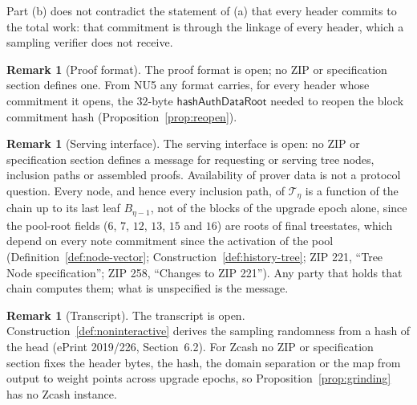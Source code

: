 \documentclass[11pt,a4paper]{article}
\theoremstyle{definition}
\newtheorem{remark}[theorem]{Remark}
\begin{document}
Part (b) does not contradict the statement of (a) that every header commits
to the total work: that commitment is through the linkage of every header,
which a sampling verifier does not receive.

\begin{remark}[Proof format]
The proof format is open; no ZIP or specification section defines one. From
NU5 any format carries, for every header whose commitment it opens, the
$32$-byte $\mathsf{hashAuthDataRoot}$ needed to reopen the block commitment
hash (Proposition~\ref{prop:reopen}).
\end{remark}

\begin{remark}[Serving interface]
The serving interface is open: no ZIP or specification section defines a
message for requesting or serving tree nodes, inclusion paths or assembled
proofs. Availability of prover data is not a protocol question. Every node,
and hence every inclusion path, of $\mathcal{T}_\eta$ is a function of the
chain up to its last leaf $B_{\eta-1}$, not of the blocks of the upgrade
epoch alone, since the pool-root fields ($6$, $7$, $12$, $13$, $15$ and
$16$) are roots of final treestates, which depend on every note commitment
since the activation of the pool (Definition~\ref{def:node-vector};
Construction~\ref{def:history-tree}; ZIP 221, ``Tree Node specification'';
ZIP 258, ``Changes to ZIP 221''). Any party that holds that chain computes
them; what is unspecified is the message.
\end{remark}

\begin{remark}[Transcript]
The transcript is open. Construction~\ref{def:noninteractive} derives the
sampling randomness from a hash of the head (ePrint 2019/226, Section~6.2).
For Zcash no ZIP or specification section fixes the header bytes, the hash,
the domain separation or the map from output to weight points across upgrade
epochs, so Proposition~\ref{prop:grinding} has no Zcash instance.
\end{remark}
\end{document}
